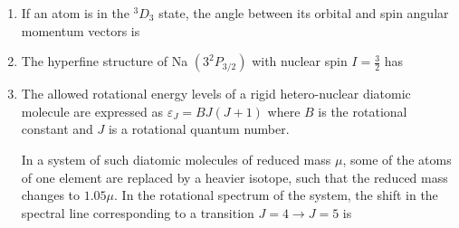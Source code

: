 \documentclass[journal,13pt,onecolumn]{IEEEtran}
\begin{document}
\begin{enumerate}[itemsep = 1em]
\hfill{}
\begin{enumerate}
\end{enumerate}

\item If an atom is in the $^{3}D_{3}$ state, the angle between its orbital and spin angular momentum vectors is

\hfill{}
\begin{enumerate}
\end{enumerate}

\item The hyperfine structure of Na $(3^{2}P_{3/2})$ with nuclear spin $I = \frac{3}{2}$ has

\hfill{}
\begin{enumerate}
\end{enumerate}

\item The allowed rotational energy levels of a rigid hetero-nuclear diatomic molecule are expressed as $\varepsilon_{J} = BJ(J+1)$ where $B$ is the rotational constant and $J$ is a rotational quantum number.

In a system of such diatomic molecules of reduced mass $\mu$, some of the atoms of one element are replaced by a heavier isotope, such that the reduced mass changes to $1.05\mu$. In the rotational spectrum of the system, the shift in the spectral line corresponding to a transition $J=4 \to J=5$ is


\end{enumerate}
\end{document}
